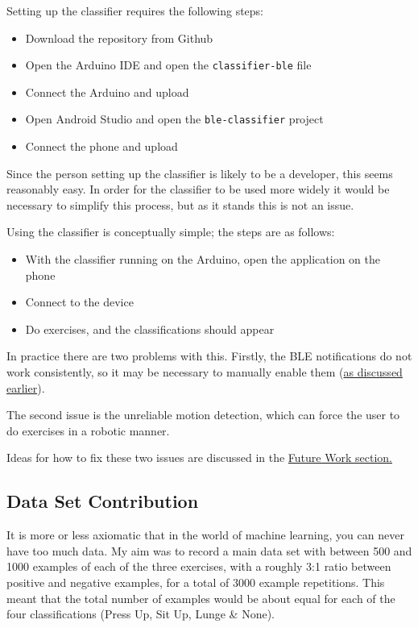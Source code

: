 \documentclass[a4paper]{article}
\begin{document}
Setting up the classifier requires the following steps:

\begin{itemize}
\item Download the repository from Github
\item Open the Arduino IDE and open the \lstinline{classifier-ble} file
\item Connect the Arduino and upload
\item Open Android Studio and open the \lstinline{ble-classifier} project
\item Connect the phone and upload
\end{itemize}

Since the person setting up the classifier is likely to be a developer, this seems reasonably easy. In order for the classifier to be used more widely it would be necessary to simplify this process, but as it stands this is not an issue.

Using the classifier is conceptually simple; the steps are as follows:

\begin{itemize}
\item With the classifier running on the Arduino, open the application on the phone
\item Connect to the device
\item Do exercises, and the classifications should appear
\end{itemize}

In practice there are two problems with this. Firstly, the BLE notifications do not work consistently, so it may be necessary to manually enable them (\hyperref[para:ev_cl_classifierble]{as discussed earlier}).

The second issue is the unreliable motion detection, which can force the user to do exercises in a robotic manner. 

Ideas for how to fix these two issues are discussed in the \hyperref[subsec:fw_futurework]{Future Work section.}

\newpage
\subsection{Data Set Contribution}
\label{subsec:ev_ds}

It is more or less axiomatic that in the world of machine learning, you can never have too much data. My aim was to record a main data set with between 500 and 1000 examples of each of the three exercises, with a roughly 3:1 ratio between positive and negative examples, for a total of 3000 example repetitions. This meant that the total number of examples would be about equal for each of the four classifications (Press Up, Sit Up, Lunge \& None).
\end{document}
